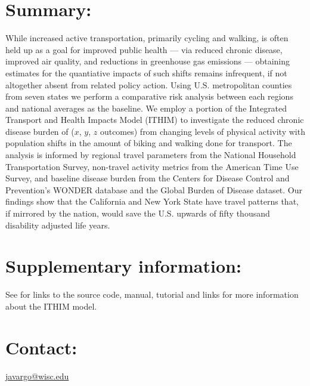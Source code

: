 \section{Summary:}

While increased active transportation, primarily cycling and walking,
is often held up as a goal for improved public health --- via reduced
chronic disease, improved air quality, and reductions in greenhouse
gas emissions — obtaining estimates for the quantiative impacts of
such shifts remains infrequent, if not altogether absent from related
policy action. Using U.S. metropolitan counties from seven states we
perform a comparative risk analysis between each regions and national
averages as the baseline.  We employ a portion of the Integrated
Transport and Health Impacts Model (ITHIM) to investigate the reduced
chronic disease burden of ($x$, $y$, $z$ outcomes) from changing
levels of physical activity with population shifts in the amount of
biking and walking done for transport. The analysis is informed by
regional travel parameters from the National Household Transportation
Survey, non-travel activity metrics from the American Time Use Survey,
and baseline disease burden from the Centers for Disease Control and
Prevention's WONDER database and the Global Burden of Disease dataset.
Our findings show that the California and New York State have travel
patterns that, if mirrored by the nation, would save the U.S. upwards
of fifty thousand disability adjusted life years.



\section{Supplementary information:}

See \webpage{} for links to the source code, manual, tutorial and
links for more information about the ITHIM model.

\section{Contact:}
\href{javargo@wisc.edu}{javargo@wisc.edu}

